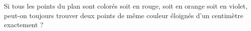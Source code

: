 Si tous les points du plan sont colorés soit en rouge, soit en orange soit en violet, peut-on toujours trouver deux points de même couleur éloignés d'un centimètre exactement ?